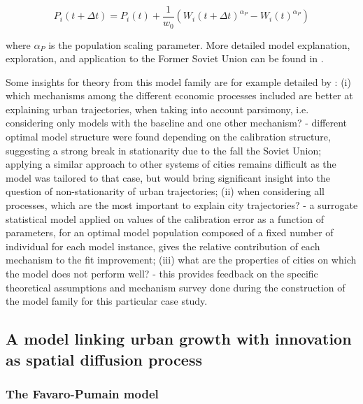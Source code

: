 \documentclass[10pt]{article}
\begin{document}
\begin{equation}
	P_i (t+\Delta t) = P_i (t) + \frac{1}{w_0} \left( W_i (t+\Delta t)^{\alpha_P} - W_i (t)^{\alpha_P} \right)	
\end{equation}

where $\alpha_P$ is the population scaling parameter. More detailed model explanation, exploration, and application to the Former Soviet Union can be found in \citep{cottineau2014evolution,cottineau2015growing,cottineau2015modular}.


Some insights for theory from this model family are for example detailed by \citep{cottineau2015modular}: (i) which mechanisms among the different economic processes included are better at explaining urban trajectories, when taking into account parsimony, i.e. considering only models with the baseline and one other mechanism? - different optimal model structure were found depending on the calibration structure, suggesting a strong break in stationarity due to the fall the Soviet Union; applying a similar approach to other systems of cities remains difficult as the model was tailored to that case, but would bring significant insight into the question of non-stationarity of urban trajectories; (ii) when considering all processes, which are the most important to explain city trajectories? - a surrogate statistical model applied on values of the calibration error as a function of parameters, for an optimal model population composed of a fixed number of individual for each model instance, gives the relative contribution of each mechanism to the fit improvement; (iii) what are the properties of cities on which the model does not perform well? - this provides feedback on the specific theoretical assumptions and mechanism survey done during the construction of the model family for this particular case study.


\subsection{A model linking urban growth with innovation as spatial diffusion process}

\subsubsection{The Favaro-Pumain model}
\end{document}
